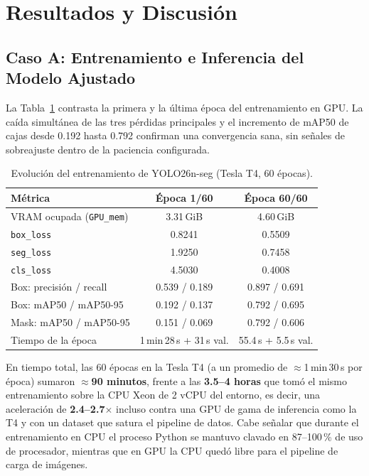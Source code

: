 \section{Resultados y Discusión}

\subsection{Caso A: Entrenamiento e Inferencia del Modelo Ajustado}
\label{sec:res_a}

La Tabla~\ref{tab:epochs} contrasta la primera y la última época del
entrenamiento en GPU. La caída simultánea de las tres pérdidas principales y el
incremento de mAP50 de cajas desde 0.192 hasta 0.792 confirman una convergencia
sana, sin señales de sobreajuste dentro de la paciencia configurada.

\begin{table}[H]
\centering
\caption{Evolución del entrenamiento de YOLO26n-seg (Tesla T4, 60 épocas).}
\label{tab:epochs}
\setlength{\tabcolsep}{6pt}
\begin{tabular}{lcc}
  \toprule
  \textbf{Métrica} & \textbf{Época 1/60} & \textbf{Época 60/60} \\
  \midrule
  VRAM ocupada (\texttt{GPU\_mem})    & 3.31\,GiB & 4.60\,GiB \\
  \texttt{box\_loss}                  & 0.8241    & 0.5509 \\
  \texttt{seg\_loss}                  & 1.9250    & 0.7458 \\
  \texttt{cls\_loss}                  & 4.5030    & 0.4008 \\
  Box: precisión / recall             & 0.539 / 0.189 & 0.897 / 0.691 \\
  Box: mAP50 / mAP50-95               & 0.192 / 0.137 & 0.792 / 0.695 \\
  Mask: mAP50 / mAP50-95              & 0.151 / 0.069 & 0.792 / 0.606 \\
  Tiempo de la época                  & 1\,min\,28\,s + 31\,s val. & 55.4\,s + 5.5\,s val. \\
  \bottomrule
\end{tabular}
\end{table}

En tiempo total, las 60 épocas en la Tesla T4 (a un promedio de
$\approx$1\,min\,30\,s por época) sumaron \textbf{$\approx$90 minutos},
frente a las \textbf{3.5--4 horas} que tomó el mismo entrenamiento sobre la CPU
Xeon de 2 vCPU del entorno, es decir, una aceleración de
\textbf{2.4--2.7$\times$} incluso contra una GPU de gama de inferencia como la
T4 y con un dataset que satura el pipeline de datos. Cabe señalar que durante
el entrenamiento en CPU el proceso Python se mantuvo clavado en 87--100\,\% de
uso de procesador, mientras que en GPU la CPU quedó libre para el pipeline de
carga de imágenes.

